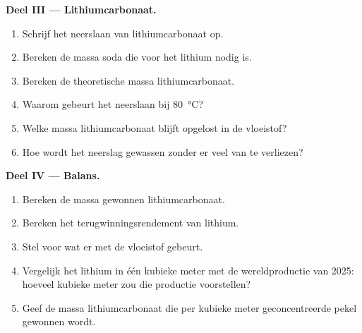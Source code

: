 \begin{problem}
\medskip
\noindent\textbf{Deel III --- Lithiumcarbonaat.}
\begin{enumerate}[resume]
  \item Schrijf het neerslaan van lithiumcarbonaat op.
  \item Bereken de massa soda die voor het lithium nodig is.
  \item Bereken de theoretische massa lithiumcarbonaat.
  \item Waarom gebeurt het neerslaan bij \qty{80}{\celsius}?
  \item Welke massa lithiumcarbonaat blijft opgelost in de vloeistof?
  \item Hoe wordt het neerslag gewassen zonder er veel van te verliezen?
\end{enumerate}

\medskip
\noindent\textbf{Deel IV --- Balans.}
\begin{enumerate}[resume]
  \item Bereken de massa gewonnen lithiumcarbonaat.
  \item Bereken het terugwinningsrendement van lithium.
  \item Stel voor wat er met de vloeistof gebeurt.
  \item Vergelijk het lithium in één kubieke meter met de
        wereldproductie van 2025: hoeveel kubieke meter zou die productie
        voorstellen?
  \item Geef de massa lithiumcarbonaat die per kubieke meter
        geconcentreerde pekel gewonnen wordt.
\end{enumerate}
\end{problem}

